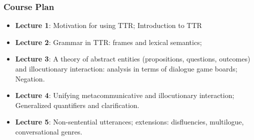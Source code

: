 \documentclass{beamer}
\newcommand{\bit}{\begin{itemize}}
\newcommand{\eit}{\end{itemize}}
\begin{document}
\begin{frame}\frametitle{Course Plan}
\bit

\item  {\bf Lecture 1}: Motivation for using TTR; Introduction to TTR

\item {\bf Lecture 2}: Grammar in TTR: frames and lexical semantics;
  

\item {\bf Lecture 3}: A theory of abstract entities (propositions,
  questions, outcomes) and illocutionary
  interaction: analysis in terms of dialogue game boards; Negation.

\item {\bf Lecture 4}: Unifying metacommunicative and illocutionary
  interaction; Generalized quantifiers and clarification.

\item {\bf Lecture 5}: Non-sentential utterances; extensions:
  disfluencies, multilogue, conversational genres.

\eit
\end{frame}


\end{document}
